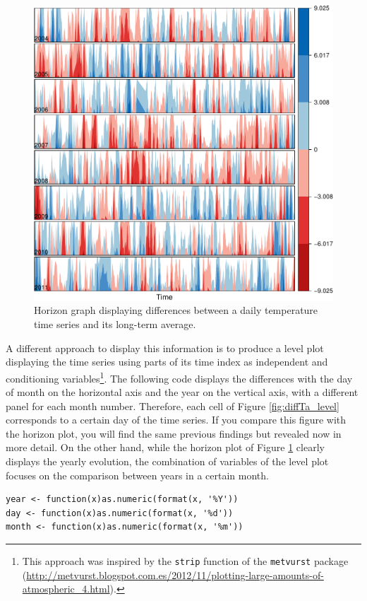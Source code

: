 \documentclass[smallroyalvopaper]{memoir}
\begin{document}
\begin{figure}[htb]
\centering
\includegraphics[width=.9\linewidth]{figs/diffTa_horizon.pdf}
\caption{\label{fig:diffTa_horizon}Horizon graph displaying differences between a daily temperature time series and its long-term average.}
\end{figure}

A different approach to display this information is to produce a level
plot displaying the time series using parts of its time index as
independent and conditioning variables\footnote{This approach was inspired by the \texttt{strip} function of the
\texttt{metvurst} package
(\url{http://metvurst.blogspot.com.es/2012/11/plotting-large-amounts-of-atmospheric_4.html}).}. The following code
displays the differences with the day of month on the horizontal axis
and the year on the vertical axis, with a different panel for each
month number. Therefore, each cell of Figure \ref{fig:diffTa_level}
corresponds to a certain day of the time series. If you compare this
figure with the horizon plot, you will find the same previous findings
but revealed now in more detail. On the other hand, while the horizon
plot of Figure \ref{fig:diffTa_horizon} clearly displays the yearly
evolution, the combination of variables of the level plot focuses on
the comparison between years in a certain month.

\lstset{language=R,numbers=none}
\begin{lstlisting}
year <- function(x)as.numeric(format(x, '%Y'))
day <- function(x)as.numeric(format(x, '%d'))
month <- function(x)as.numeric(format(x, '%m'))
\end{lstlisting}
\end{document}
